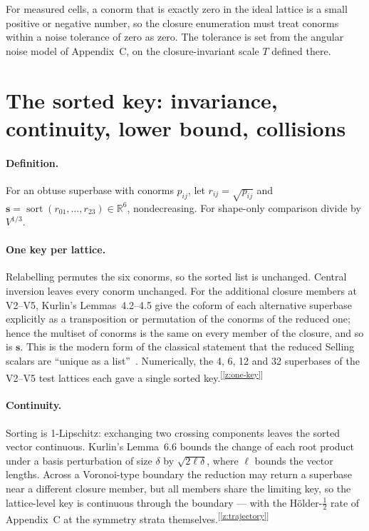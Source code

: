 \documentclass[11pt]{article}
\newcommand{\sortkey}{\mathbf{s}}
\newcommand{\chk}[1]{\textsuperscript{[\ref{#1}]}}
\begin{document}
For measured cells, a conorm that is exactly zero in the ideal lattice is a small positive or negative number, so the closure enumeration must treat conorms within a noise tolerance of zero as zero. The tolerance is set from the angular noise model of Appendix~C, on the closure-invariant scale $T$ defined there.

\section{The sorted key: invariance, continuity, lower bound, collisions}
\label{app:key}

\paragraph{Definition.}
For an obtuse superbase with conorms $p_{ij}$, let $r_{ij}=\sqrt{p_{ij}}$ and $\sortkey=\operatorname{sort}(r_{01},\dots,r_{23})\in\mathbb R^6$, nondecreasing. For shape-only comparison divide by $V^{1/3}$.

\paragraph{One key per lattice.}
Relabelling permutes the six conorms, so the sorted list is unchanged. Central inversion leaves every conorm unchanged. For the additional closure members at V2--V5, Kurlin's Lemmas~4.2--4.5 give the coform of each alternative superbase explicitly as a transposition or permutation of the conorms of the reduced one; hence the multiset of conorms is the same on every member of the closure, and so is $\sortkey$. This is the modern form of the classical statement that the reduced Selling scalars are ``unique as a list''~\cite{bravais1850,delone1932,abs2019}. Numerically, the 4, 6, 12 and 32 superbases of the V2--V5 test lattices each gave a single sorted key.\chk{z:one-key}

\paragraph{Continuity.}
Sorting is 1-Lipschitz: exchanging two crossing components leaves the sorted vector continuous. Kurlin's Lemma~6.6 bounds the change of each root product under a basis perturbation of size $\delta$ by $\sqrt{2\ell\delta}$, where $\ell$ bounds the vector lengths. Across a Voronoi-type boundary the reduction may return a superbase near a different closure member, but all members share the limiting key, so the lattice-level key is continuous through the boundary --- with the H\"older-$\tfrac12$ rate of Appendix~C at the symmetry strata themselves.\chk{z:trajectory}
\end{document}
